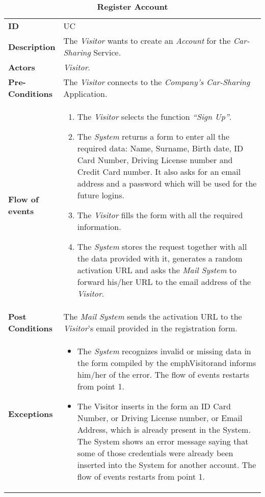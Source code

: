 

\begin{longtable}{|p{0.2\linewidth} p{0.8\linewidth}|}
	\captionsetup{labelformat=empty} %
	\caption{\textbf{Register Account}} %
	\label{UC_Register}%
	\\ \hline %
	
	\textbf{ID} & UC\theUseCaseIdCounter \\ \hline
	\textbf{Description} & The \emph{Visitor} wants to create an \emph{Account} for the \emph{Car-Sharing} Service. \\ \hline
	\textbf{Actors} & \emph{Visitor}.\\ \hline
	\textbf{Pre-Conditions} & The \emph{Visitor} connects to the \emph{Company's Car-Sharing} Application. \\ \hline
	\textbf{Flow of events} & 
		\begin{enumerate}
			\item The \emph{Visitor} selects the function \textit{\textquotedblleft{Sign Up}\textquotedblright}.
			\item The \emph{System} returns a form to enter all the required data: Name, Surname, Birth date, ID Card Number, Driving License number and Credit Card number. It also asks for an email address and a password which will be used for the future logins.
			\item The \emph{Visitor} fills the form with all the required information.
			\item The \emph{System} stores the request together with all the data provided with it, generates a random activation URL and asks the \emph{Mail System} to forward his/her URL to the email address of the \emph{Visitor}.
		\end{enumerate}	 \\ \hline
	\textbf{Post Conditions} & The \emph{Mail System} sends the activation URL to the \emph{Visitor}'s email provided in the registration form. \\ \hline
	\textbf{Exceptions} & 
		\begin{itemize}
		\item The \emph{System} recognizes invalid or missing data in the form compiled by the emph{Visitor}and informs him/her of the error. The flow of events restarts from point 1.
		\item The Visitor inserts in the form an ID Card Number, or Driving License number, or Email Address, which is already present in the System. The System shows an error message saying that some of those credentials were already been inserted into the System for another account. The flow of events restarts from point 1.
		\end{itemize} \\ \hline
\end{longtable}


